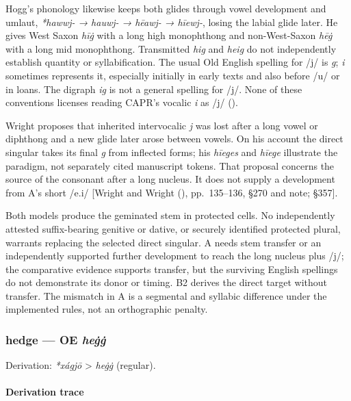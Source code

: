 \documentclass[
  british,
  a4paper,
]{article}
\begin{document}
Hogg's phonology likewise keeps both glides through vowel development
and umlaut, \emph{*hawwj- → hauwj- → hēawj- → hīewj-}, losing the labial
glide later. He gives West Saxon \emph{hīġ} with a long high monophthong
and non-West-Saxon \emph{hēġ} with a long mid monophthong. Transmitted
\emph{hig} and \emph{heig} do not independently establish quantity or
syllabification. The usual Old English spelling for /j/ is \emph{g};
\emph{i} sometimes represents it, especially initially in early texts
and also before /u/ or in loans. The digraph \emph{ig} is not a general
spelling for /j/. None of these conventions licenses reading CAPR's
vocalic \emph{i} as /j/ ().

Wright proposes that inherited intervocalic \emph{j} was lost after a
long vowel or diphthong and a new glide later arose between vowels. On
his account the direct singular takes its final \emph{g} from inflected
forms; his \emph{hīeges} and \emph{hīege} illustrate the paradigm, not
separately cited manuscript tokens. That proposal concerns the source of
the consonant after a long nucleus. It does not supply a development
from A's short /e.i/ {[}Wright and Wright
(), pp.~135--136, §270 and note; §357{]}.

Both models produce the geminated stem in protected cells. No
independently attested suffix-bearing genitive or dative, or securely
identified protected plural, warrants replacing the selected direct
singular. A needs stem transfer or an independently supported further
development to reach the long nucleus plus /j/; the comparative evidence
supports transfer, but the surviving English spellings do not
demonstrate its donor or timing. B2 derives the direct target without
transfer. The mismatch in A is a segmental and syllabic difference under
the implemented rules, not an orthographic penalty.

\subsubsection{\texorpdfstring{hedge --- OE
\emph{heġġ}}{hedge --- OE heġġ}}\label{hedge-oe-heux121ux121}

Derivation: \emph{*xágjō} \textgreater{} \emph{heġġ} (regular).

\paragraph{Derivation trace}\label{derivation-trace-41}
\end{document}
